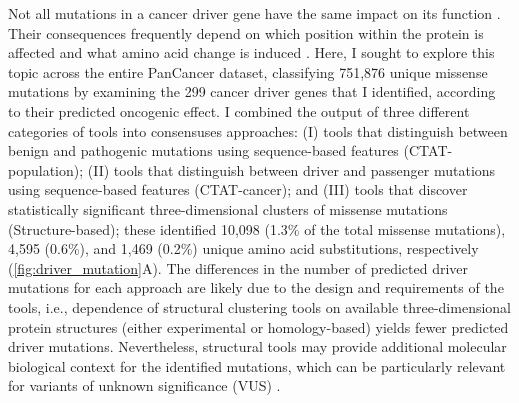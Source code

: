 Not all mutations in a cancer driver gene have the same impact on its function \cite{RN183}. Their consequences frequently depend on which position within the protein is affected and what amino acid change is induced \cite{RN29}. Here, I sought to explore this topic across the entire PanCancer dataset, classifying 751,876 unique missense mutations by examining the 299 cancer driver genes that I identified, according to their predicted oncogenic effect. I combined the output of three different categories of tools into consensuses approaches: (I) tools that distinguish between benign and pathogenic mutations using sequence-based features (CTAT-population); (II) tools that distinguish between driver and passenger mutations using sequence-based features (CTAT-cancer); and (III) tools that discover statistically significant three-dimensional clusters of missense mutations (Structure-based); these identified 10,098 (1.3\% of the total missense mutations), 4,595 (0.6\%), and 1,469 (0.2\%) unique amino acid substitutions, respectively (\autoref{fig:driver_mutation}A). The differences in the number of predicted driver mutations for each approach are likely due to the design and requirements of the tools, i.e., dependence of structural clustering tools on available three-dimensional protein structures (either experimental or homology-based) yields fewer predicted driver mutations. Nevertheless, structural tools may provide additional molecular biological context for the identified mutations, which can be particularly relevant for variants of unknown significance (VUS) \cite{RN184}.

